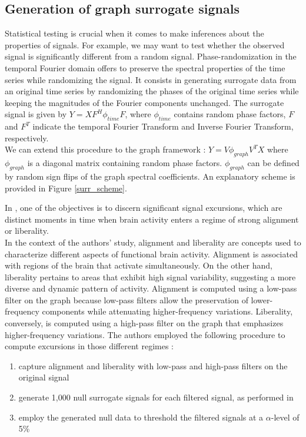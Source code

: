\subsection{Generation of graph surrogate signals}

Statistical testing is crucial when it comes to make inferences about the properties of signals. For example, we may want to test whether the observed signal is significantly different from a random signal. 
Phase-randomization in the temporal Fourier domain \cite{theiler_testing_1992} offers to preserve the spectral properties of the time series while randomizing the signal. It consists in generating surrogate data from an original time series by randomizing the phases of the original time series while keeping the magnitudes of the Fourier components unchanged. The surrogate signal is given by $Y = XF^H\phi_{time}F$, where $\phi_{time}$ contains random phase factors, $F$ and $F^T$ indicate the temporal Fourier Transform and Inverse Fourier Transform, respectively. \\
We can extend this procedure to the graph framework : $Y=V\phi_{graph}V^TX$ where $\phi_{graph}$ is a diagonal matrix containing random phase factors. $\phi_{graph}$ can be defined by random sign flips of the graph spectral coefficients. An explanatory scheme is provided in Figure \ref{surr_scheme}. 


In \cite{huang_graph_2018}, one of the objectives is to discern significant signal excursions, which are distinct moments in time when brain activity enters a regime of strong alignment or liberality. \\
In the context of the authors' study, alignment and liberality are concepts used to characterize different aspects of functional brain activity. Alignment is associated with regions of the brain that activate simultaneously. On the other hand, liberality pertains to areas that exhibit high signal variability, suggesting a more diverse and dynamic pattern of activity. Alignment is computed using a low-pass filter on the graph because low-pass filters allow the preservation of lower-frequency components while attenuating higher-frequency variations. Liberality, conversely, is computed using a high-pass filter on the graph that emphasizes higher-frequency variations. The authors employed the following procedure to compute excursions in those different regimes :
\begin{enumerate}
    \item capture alignment and liberality with low-pass and high-pass filters on the original signal
    \item generate 1,000 null surrogate signals for each filtered signal, as performed in \cite{pirondini_spectral_2016}
    \item employ the generated null data to threshold the filtered signals at a $\alpha$-level of 5\%
\end{enumerate}


